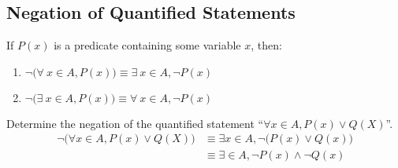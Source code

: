 \documentclass[../notes.tex]{subfiles}
\begin{document}
			\subsection{Negation of Quantified Statements}
				If $P(x)$ is a predicate containing some variable $x$, then:
				\begin{enumerate}
					\item $\lnot \bigl(\forall \: x \in A, P(x)\bigr) \equiv \exists \: x \in A, \lnot P(x)$
					\item $\lnot \bigl(\exists \: x \in A, P(x)\bigr) \equiv \forall \: x \in A, \lnot P(x)$
				\end{enumerate}
			\begin{example}
				Determine the negation of the quantified statement ``$\forall x \in A, P(x) \lor Q(X)$''.
				\begin{align*}
					\lnot \bigl(\forall x \in A, P(x) \lor Q(X)\bigr) &\equiv \exists x \in A, \lnot \bigl(P(x) \lor Q(x)\bigr)\\
					& \equiv \exists \in A, \lnot P(x) \land \lnot Q(x)
				\end{align*}
			\end{example}
			\pagebreak
\end{document}
